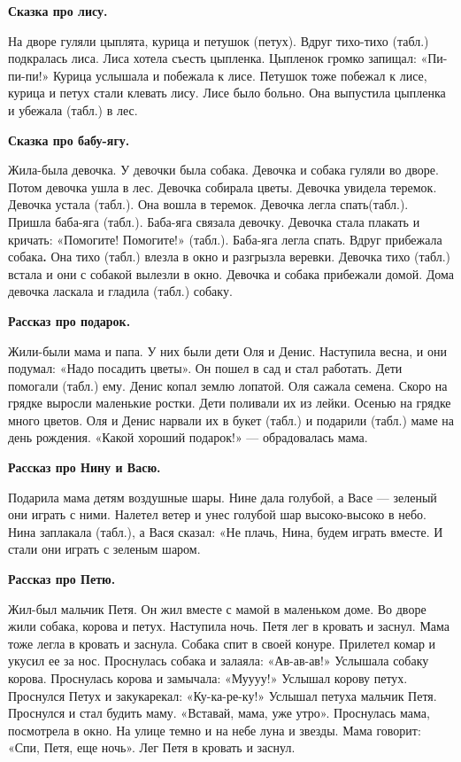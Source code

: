 \documentclass{book}
\begin{document}
\textbf{Сказка про лису.}

На дворе гуляли цыплята, курица и петушок (петух). Вдруг тихо-тихо
(табл.) подкралась лиса. Лиса хотела съесть цыпленка. Цыпленок громко
запищал: «Пи-пи-пи!» Курица услышала и побежала к лисе. Петушок тоже
побежал к лисе, курица и петух стали клевать лису. Лисе было больно. Она
выпустила цыпленка и убежала (табл.) в лес.

\textbf{Сказка про бабу-ягу.}

Жила-была девочка. У девочки была собака. Девочка и собака гуляли во
дворе. Потом девочка ушла в лес. Девочка собирала цветы. Девочка увидела
теремок. Девочка устала (табл.). Она вошла в теремок. Девочка легла
спать(табл.). Пришла баба-яга (табл.). Баба-яга связала девочку. Девочка
стала плакать и кричать: «Помогите! Помогите!» (табл.). Баба-яга легла
спать. Вдруг прибежала собака\textbf{.} Она тихо (табл.) влезла в окно и
разгрызла веревки. Девочка тихо (табл.) встала и они с собакой вылезли в
окно. Девочка и собака прибежали домой. Дома девочка ласкала и гладила
(табл.) собаку.

\textbf{Рассказ про подарок.}

Жили-были мама и папа. У них были дети Оля и Денис. Наступила весна, и
они подумал: «Надо посадить цветы». Он пошел в сад и стал работать. Дети
помогали (табл.) ему. Денис копал землю лопатой. Оля сажала семена.
Скоро на грядке выросли маленькие ростки. Дети поливали их из лейки.
Осенью на грядке много цветов. Оля и Денис нарвали их в букет (табл.) и
подарили (табл.) маме на день рождения. «Какой хороший подарок!» ---
обрадовалась мама.

\textbf{Рассказ про Нину и Васю.}

Подарила мама детям воздушные шары. Нине дала голубой, а Васе ---
зеленый они играть с ними. Налетел ветер и унес голубой шар
высоко-высоко в небо. Нина заплакала (табл.), а Вася сказал: «Не плачь,
Нина, будем играть вместе. И стали они играть с зеленым шаром.

\textbf{Рассказ про Петю.}

Жил-был мальчик Петя. Он жил вместе с мамой в маленьком доме. Во дворе
жили собака, корова и петух. Наступила ночь. Петя лег в кровать и
заснул. Мама тоже легла в кровать и заснула. Собака спит в своей конуре.
Прилетел комар и укусил ее за нос. Проснулась собака и залаяла:
«Ав-ав-ав!» Услышала собаку корова. Проснулась корова и замычала:
«Муууу!» Услышал корову петух. Проснулся Петух и закукарекал:
«Ку-ка-ре-ку!» Услышал петуха мальчик Петя. Проснулся и стал будить
маму. «Вставай, мама, уже утро». Проснулась мама, посмотрела в окно. На
улице темно и на небе луна и звезды. Мама говорит: «Спи, Петя, еще
ночь». Лег Петя в кровать и заснул.
\end{document}
